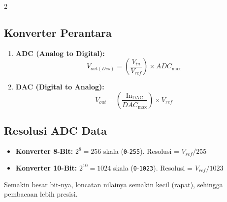 \documentclass[10pt]{article}
\begin{document}
\begin{multicols}{2}
\subsection*{Konverter Perantara}
\begin{enumerate}
    \item \textbf{ADC (Analog to Digital):}
    \[ V_{out(Des)} = \left( \frac{V_{in}}{V_{ref}} \right) \times ADC_{\text{max}} \]
    \item \textbf{DAC (Digital to Analog):}
    \[ V_{out} = \left( \frac{\text{In}_{\text{DAC}}}{DAC_{\text{max}}} \right) \times V_{ref} \]
\end{enumerate}

\subsection*{Resolusi ADC Data}
\begin{itemize}
    \item \textbf{Konverter 8-Bit:} $2^8 = 256$ skala (\texttt{0}-\texttt{255}). 
    Resolusi = $V_{ref} / 255$
    \item \textbf{Konverter 10-Bit:} $2^{10} = 1024$ skala (\texttt{0}-\texttt{1023}).
    Resolusi = $V_{ref} / 1023$
\end{itemize}
Semakin besar bit-nya, loncatan nilainya semakin kecil (rapat), sehingga pembacaan lebih presisi.

\end{multicols}
\end{document}
